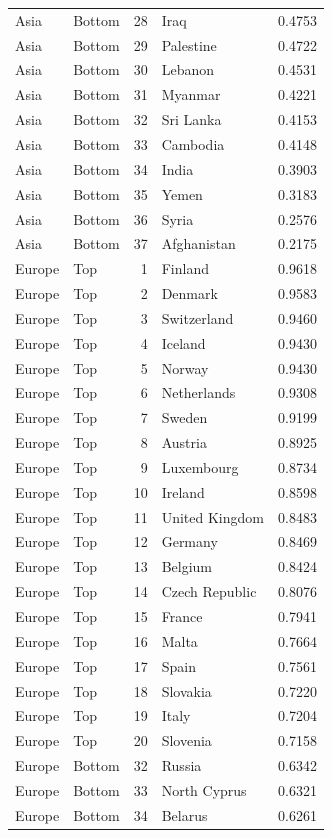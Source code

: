 \begin{table}
\begin{tabular}{llrlr}
Asia & Bottom & 28 & Iraq & 0.4753 \\
Asia & Bottom & 29 & Palestine & 0.4722 \\
Asia & Bottom & 30 & Lebanon & 0.4531 \\
Asia & Bottom & 31 & Myanmar & 0.4221 \\
Asia & Bottom & 32 & Sri Lanka & 0.4153 \\
Asia & Bottom & 33 & Cambodia & 0.4148 \\
Asia & Bottom & 34 & India & 0.3903 \\
Asia & Bottom & 35 & Yemen & 0.3183 \\
Asia & Bottom & 36 & Syria & 0.2576 \\
Asia & Bottom & 37 & Afghanistan & 0.2175 \\
Europe & Top & 1 & Finland & 0.9618 \\
Europe & Top & 2 & Denmark & 0.9583 \\
Europe & Top & 3 & Switzerland & 0.9460 \\
Europe & Top & 4 & Iceland & 0.9430 \\
Europe & Top & 5 & Norway & 0.9430 \\
Europe & Top & 6 & Netherlands & 0.9308 \\
Europe & Top & 7 & Sweden & 0.9199 \\
Europe & Top & 8 & Austria & 0.8925 \\
Europe & Top & 9 & Luxembourg & 0.8734 \\
Europe & Top & 10 & Ireland & 0.8598 \\
Europe & Top & 11 & United Kingdom & 0.8483 \\
Europe & Top & 12 & Germany & 0.8469 \\
Europe & Top & 13 & Belgium & 0.8424 \\
Europe & Top & 14 & Czech Republic & 0.8076 \\
Europe & Top & 15 & France & 0.7941 \\
Europe & Top & 16 & Malta & 0.7664 \\
Europe & Top & 17 & Spain & 0.7561 \\
Europe & Top & 18 & Slovakia & 0.7220 \\
Europe & Top & 19 & Italy & 0.7204 \\
Europe & Top & 20 & Slovenia & 0.7158 \\
Europe & Bottom & 32 & Russia & 0.6342 \\
Europe & Bottom & 33 & North Cyprus & 0.6321 \\
Europe & Bottom & 34 & Belarus & 0.6261 \\

\end{tabular}
\end{table}
